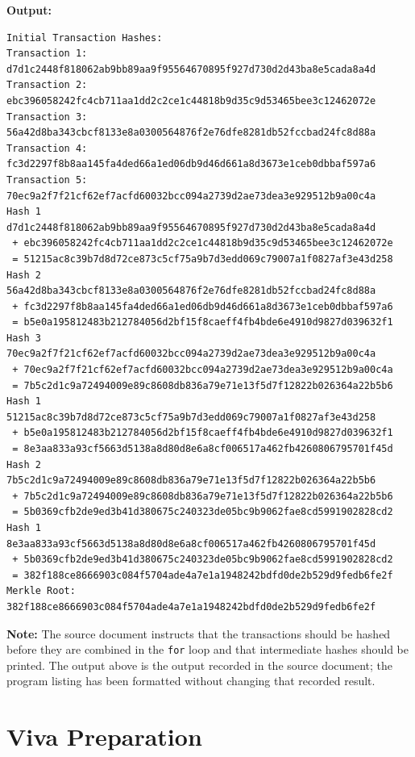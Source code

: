 \documentclass[12pt,a4paper]{article}
\begin{document}
\textbf{Output:}
\begin{lstlisting}[style=outputstyle]
Initial Transaction Hashes: 
Transaction 1: d7d1c2448f818062ab9bb89aa9f95564670895f927d730d2d43ba8e5cada8a4d
Transaction 2: ebc396058242fc4cb711aa1dd2c2ce1c44818b9d35c9d53465bee3c12462072e
Transaction 3: 56a42d8ba343cbcf8133e8a0300564876f2e76dfe8281db52fccbad24fc8d88a
Transaction 4: fc3d2297f8b8aa145fa4ded66a1ed06db9d46d661a8d3673e1ceb0dbbaf597a6
Transaction 5: 70ec9a2f7f21cf62ef7acfd60032bcc094a2739d2ae73dea3e929512b9a00c4a
Hash 1
d7d1c2448f818062ab9bb89aa9f95564670895f927d730d2d43ba8e5cada8a4d
 + ebc396058242fc4cb711aa1dd2c2ce1c44818b9d35c9d53465bee3c12462072e
 = 51215ac8c39b7d8d72ce873c5cf75a9b7d3edd069c79007a1f0827af3e43d258
Hash 2
56a42d8ba343cbcf8133e8a0300564876f2e76dfe8281db52fccbad24fc8d88a
 + fc3d2297f8b8aa145fa4ded66a1ed06db9d46d661a8d3673e1ceb0dbbaf597a6
 = b5e0a195812483b212784056d2bf15f8caeff4fb4bde6e4910d9827d039632f1
Hash 3
70ec9a2f7f21cf62ef7acfd60032bcc094a2739d2ae73dea3e929512b9a00c4a
 + 70ec9a2f7f21cf62ef7acfd60032bcc094a2739d2ae73dea3e929512b9a00c4a
 = 7b5c2d1c9a72494009e89c8608db836a79e71e13f5d7f12822b026364a22b5b6
Hash 1
51215ac8c39b7d8d72ce873c5cf75a9b7d3edd069c79007a1f0827af3e43d258
 + b5e0a195812483b212784056d2bf15f8caeff4fb4bde6e4910d9827d039632f1
 = 8e3aa833a93cf5663d5138a8d80d8e6a8cf006517a462fb4260806795701f45d
Hash 2
7b5c2d1c9a72494009e89c8608db836a79e71e13f5d7f12822b026364a22b5b6
 + 7b5c2d1c9a72494009e89c8608db836a79e71e13f5d7f12822b026364a22b5b6
 = 5b0369cfb2de9ed3b41d380675c240323de05bc9b9062fae8cd5991902828cd2
Hash 1
8e3aa833a93cf5663d5138a8d80d8e6a8cf006517a462fb4260806795701f45d
 + 5b0369cfb2de9ed3b41d380675c240323de05bc9b9062fae8cd5991902828cd2
 = 382f188ce8666903c084f5704ade4a7e1a1948242bdfd0de2b529d9fedb6fe2f
Merkle Root: 382f188ce8666903c084f5704ade4a7e1a1948242bdfd0de2b529d9fedb6fe2f

\end{lstlisting}

\textbf{Note:} The source document instructs that the transactions should be hashed before they are combined in the \texttt{for} loop and that intermediate hashes should be printed. The output above is the output recorded in the source document; the program listing has been formatted without changing that recorded result.

\section{Viva Preparation}
\end{document}

